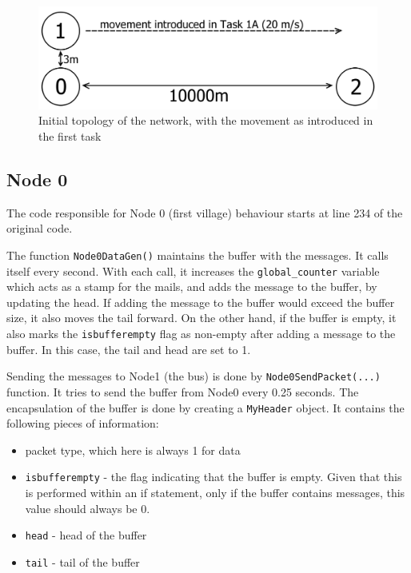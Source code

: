 \documentclass[11pt,journal]{article}
\begin{document}
	\begin{figure}[h]
		\centering
		\includegraphics[]{project_topology1.png}
		\caption{Initial topology of the network, with the movement as introduced in the first task}
	\end{figure}

	\subsection{Node 0}
	The code responsible for Node 0 (first village) behaviour starts at line 234 of the original code. 
	
	The function \texttt{Node0DataGen()} maintains the buffer with the messages. It calls itself every second. With each call, it increases the \texttt{global\_counter} variable which acts as a stamp for the mails, and adds the message to the buffer, by updating the head. If adding the message to the buffer would exceed the buffer size, it also moves the tail forward. On the other hand, if the buffer is empty, it also marks the \texttt{isbufferempty} flag as non-empty after adding a message to the buffer. In this case, the tail and head are set to 1.
	
	Sending the messages to Node1 (the bus) is done by \texttt{Node0SendPacket(...)} function. It tries to send the buffer from Node0 every 0.25 seconds. The encapsulation of the buffer is done by creating a \texttt{MyHeader} object. It contains the following pieces of information:
	
	\begin{itemize}
		\item packet type, which here is always 1 for data
		\item \texttt{isbufferempty} - the flag indicating that the buffer is empty. Given that this is performed within an if statement, only if the buffer contains messages, this value should always be 0.
		\item \texttt{head} - head of the buffer
		\item \texttt{tail} - tail of the buffer
	\end{itemize}
\end{document}
